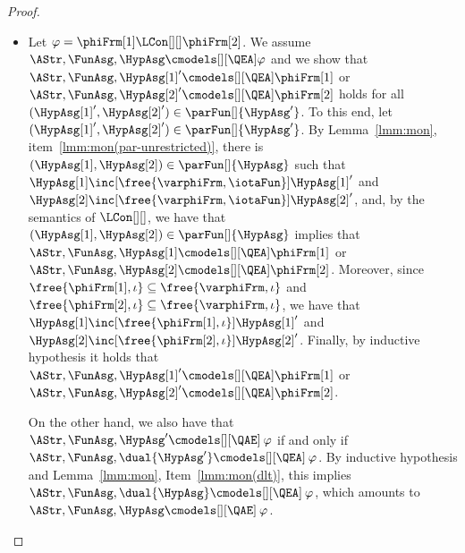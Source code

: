\documentclass[authoryear]{elsarticle}
\begin{document}
\begin{proof}
\begin{itemize}
  \item Let $\varphi = \phiFrm[1] \LCon[][] \phiFrm[2]$.
    We assume $\AStr, \FunAsg, \HypAsg \cmodels[][\QEA] \varphi$ and we show
    that $\AStr, \FunAsg, \HypAsg[1]' \cmodels[][\QEA] \phiFrm[1]$ or $\AStr,
    \FunAsg, \HypAsg[2]' \cmodels[][\QEA] \phiFrm[2]$ holds for all
    $(\HypAsg[1]', \HypAsg[2]') \in \parFun[]{\HypAsg'}$.
%
    To this end, let $(\HypAsg[1]', \HypAsg[2]') \in
    \parFun[]{\HypAsg'}$.
    By Lemma~\ref{lmm:mon}, item~\ref{lmm:mon(par-unrestricted)}, there is
    $(\HypAsg[1], \HypAsg[2]) \in \parFun[]{\HypAsg}$ such that $\HypAsg[1]
    \inc[\free{\varphiFrm,\iotaFun}] \HypAsg[1]'$ and $\HypAsg[2] \inc[\free{\varphiFrm,\iotaFun}]
    \HypAsg[2]'$, and, by the semantics of $\LCon[][]$, we have that
    $(\HypAsg[1], \HypAsg[2]) \in \parFun[]{\HypAsg}$ implies that $\AStr,
    \FunAsg, \HypAsg[1] \cmodels[][\QEA] \phiFrm[1]$ or $\AStr, \FunAsg,
    \HypAsg[2] \cmodels[][\QEA] \phiFrm[2]$.
%
    Moreover, since $\free{\phiFrm[1],\iota} \subseteq \free{\varphiFrm,\iota}$
    and $\free{\phiFrm[2],\iota} \subseteq \free{\varphiFrm,\iota}$, we have
    that $\HypAsg[1] \inc[\free{\phiFrm[1],\iota}] \HypAsg[1]'$ and $\HypAsg[2]
    \inc[\free{\phiFrm[2],\iota}] \HypAsg[2]'$.
%
    Finally, by inductive hypothesis it holds that $\AStr, \FunAsg, \HypAsg[1]'
    \cmodels[][\QEA] \phiFrm[1]$ or $\AStr, \FunAsg, \HypAsg[2]'
    \cmodels[][\QEA] \phiFrm[2]$.

    On the other hand, we also have that $\AStr, \FunAsg, \HypAsg'
    \cmodels[][\QAE]\: \varphi$ if and only if $\AStr, \FunAsg, \dual{\HypAsg'}
    \cmodels[][\QEA]\: \varphi$.
    By inductive hypothesis and Lemma~\ref{lmm:mon}, Item~\ref{lmm:mon(dlt)},
    this implies $\AStr, \FunAsg, \dual{\HypAsg} \cmodels[][\QEA]\: \varphi$,
    which amounts to $\AStr, \FunAsg, \HypAsg \cmodels[][\QAE]\: \varphi$.
%


\end{itemize}
\end{proof}
\end{document}
